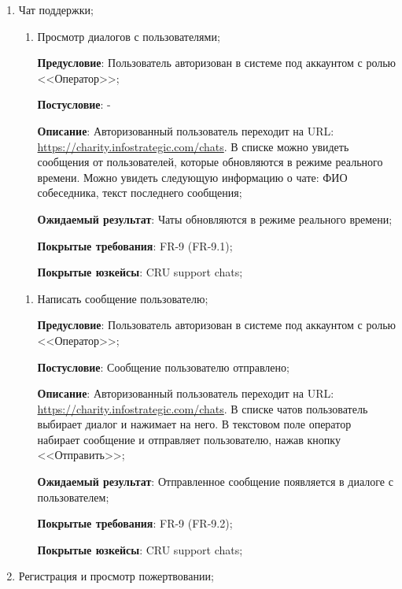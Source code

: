 \begin{enumerate}
    \item Чат поддержки;
    
    \begin{enumerate}
        \item Просмотр диалогов с пользователями;
        
        \textbf{Предусловие}: Пользователь авторизован в системе под аккаунтом с ролью <<Оператор>>;
        
        \textbf{Постусловие}: -
        
        \textbf{Описание}: Авторизованный пользователь переходит на URL: \url{https://charity.infostrategic.com/chats}. В списке можно увидеть сообщения от пользователей, которые обновляются в режиме реального времени. Можно увидеть следующую информацию о чате: ФИО собеседника, текст последнего сообщения;
        
        \textbf{Ожидаемый результат}: Чаты обновляются в режиме реального времени;
        
        \textbf{Покрытые требования}: FR-9 (FR-9.1);
        
        \textbf{Покрытые юзкейсы}: CRU support chats;
    \end{enumerate}
    
    \begin{enumerate}
        \item Написать сообщение пользователю;
        
        \textbf{Предусловие}: Пользователь авторизован в системе под аккаунтом с ролью <<Оператор>>;
        
        \textbf{Постусловие}: Сообщение пользователю отправлено;
        
        \textbf{Описание}: Авторизованный пользователь переходит на URL: \url{https://charity.infostrategic.com/chats}. В списке чатов пользователь выбирает диалог и нажимает на него. В текстовом поле оператор набирает сообщение и отправляет пользователю, нажав кнопку <<Отправить>>; 
        
        \textbf{Ожидаемый результат}: Отправленное сообщение появляется в диалоге с пользователем;
        
        \textbf{Покрытые требования}: FR-9 (FR-9.2);
        
        \textbf{Покрытые юзкейсы}: CRU support chats;
    \end{enumerate}
    
    \item Регистрация и просмотр пожертвовании;
    

\end{enumerate}
